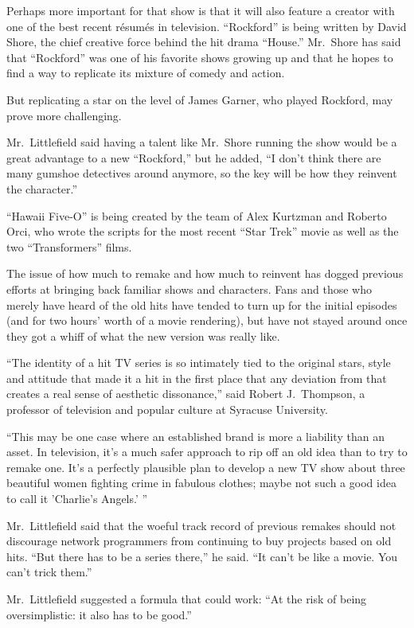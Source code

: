 ﻿\documentclass[12pt]{article}
\begin{document}
Perhaps more important for that show is that it will also feature a creator with one of the best
recent r\'esum\'es in television. ``Rockford'' is being written by David Shore, the chief creative
force behind the hit drama ``House.'' Mr.~Shore has said that ``Rockford'' was one of his favorite
shows growing up and that he hopes to find a way to replicate its mixture of comedy and action.

But replicating a star on the level of James Garner, who played Rockford, may prove more
challenging.

Mr.~Littlefield said having a talent like Mr.~Shore running the show would be a great advantage to a
new ``Rockford,'' but he added, ``I don't think there are many gumshoe detectives around anymore, so
the key will be how they reinvent the character.''

``Hawaii Five-O'' is being created by the team of Alex Kurtzman and Roberto Orci, who wrote the
scripts for the most recent ``Star Trek'' movie as well as the two ``Transformers'' films.

The issue of how much to remake and how much to reinvent has dogged previous efforts at bringing
back familiar shows and characters. Fans and those who merely have heard of the old hits have tended
to turn up for the initial episodes (and for two hours' worth of a movie rendering), but have not
stayed around once they got a whiff of what the new version was really like.

``The identity of a hit TV series is so intimately tied to the original stars, style and attitude
that made it a hit in the first place that any deviation from that creates a real sense of aesthetic
dissonance,'' said Robert J.~Thompson, a professor of television and popular culture at Syracuse
University.

``This may be one case where an established brand is more a liability than an asset. In television,
it's a much safer approach to rip off an old idea than to try to remake one. It's a perfectly
plausible plan to develop a new TV show about three beautiful women fighting crime in fabulous
clothes; maybe not such a good idea to call it 'Charlie's Angels.' ''

Mr.~Littlefield said that the woeful track record of previous remakes should not discourage network
programmers from continuing to buy projects based on old hits. ``But there has to be a series
there,'' he said. ``It can't be like a movie. You can't trick them.''

Mr.~Littlefield suggested a formula that could work: ``At the risk of being oversimplistic: it also
has to be good.''
\end{document}

